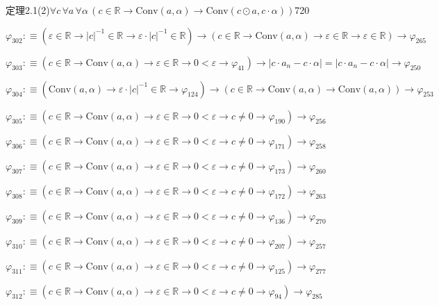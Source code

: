 \begin{fullproof}{定理2.1(2)}{$\forall c\,\forall a\,\forall \alpha\,(c \in \mathbb{R} \to \mathrm{Conv}(a,\alpha) \to \mathrm{Conv}(c \odot a,c \cdot \alpha))$}{720}
\begin{abbrevlist}
\item $\varphi_{302} :\equiv (\varepsilon \in \mathbb{R} \to \lvert c \rvert^{-1} \in \mathbb{R} \to \varepsilon \cdot \lvert c \rvert^{-1} \in \mathbb{R}) \to (c \in \mathbb{R} \to \mathrm{Conv}(a,\alpha) \to \varepsilon \in \mathbb{R} \to \varepsilon \in \mathbb{R}) \to \varphi_{265}$
\item $\varphi_{303} :\equiv (c \in \mathbb{R} \to \mathrm{Conv}(a,\alpha) \to \varepsilon \in \mathbb{R} \to 0 < \varepsilon \to \varphi_{41}) \to \lvert c \cdot a_{n} - c \cdot \alpha \rvert = \lvert c \cdot a_{n} - c \cdot \alpha \rvert \to \varphi_{250}$
\item $\varphi_{304} :\equiv (\mathrm{Conv}(a,\alpha) \to \varepsilon \cdot \lvert c \rvert^{-1} \in \mathbb{R} \to \varphi_{124}) \to (c \in \mathbb{R} \to \mathrm{Conv}(a,\alpha) \to \mathrm{Conv}(a,\alpha)) \to \varphi_{253}$
\item $\varphi_{305} :\equiv (c \in \mathbb{R} \to \mathrm{Conv}(a,\alpha) \to \varepsilon \in \mathbb{R} \to 0 < \varepsilon \to c \neq 0 \to \varphi_{190}) \to \varphi_{256}$
\item $\varphi_{306} :\equiv (c \in \mathbb{R} \to \mathrm{Conv}(a,\alpha) \to \varepsilon \in \mathbb{R} \to 0 < \varepsilon \to c \neq 0 \to \varphi_{171}) \to \varphi_{258}$
\item $\varphi_{307} :\equiv (c \in \mathbb{R} \to \mathrm{Conv}(a,\alpha) \to \varepsilon \in \mathbb{R} \to 0 < \varepsilon \to c \neq 0 \to \varphi_{173}) \to \varphi_{260}$
\item $\varphi_{308} :\equiv (c \in \mathbb{R} \to \mathrm{Conv}(a,\alpha) \to \varepsilon \in \mathbb{R} \to 0 < \varepsilon \to c \neq 0 \to \varphi_{172}) \to \varphi_{263}$
\item $\varphi_{309} :\equiv (c \in \mathbb{R} \to \mathrm{Conv}(a,\alpha) \to \varepsilon \in \mathbb{R} \to 0 < \varepsilon \to c \neq 0 \to \varphi_{136}) \to \varphi_{270}$
\item $\varphi_{310} :\equiv (c \in \mathbb{R} \to \mathrm{Conv}(a,\alpha) \to \varepsilon \in \mathbb{R} \to 0 < \varepsilon \to c \neq 0 \to \varphi_{207}) \to \varphi_{257}$
\item $\varphi_{311} :\equiv (c \in \mathbb{R} \to \mathrm{Conv}(a,\alpha) \to \varepsilon \in \mathbb{R} \to 0 < \varepsilon \to c \neq 0 \to \varphi_{125}) \to \varphi_{277}$
\item $\varphi_{312} :\equiv (c \in \mathbb{R} \to \mathrm{Conv}(a,\alpha) \to \varepsilon \in \mathbb{R} \to 0 < \varepsilon \to c \neq 0 \to \varphi_{94}) \to \varphi_{285}$

\end{abbrevlist}
\end{fullproof}
